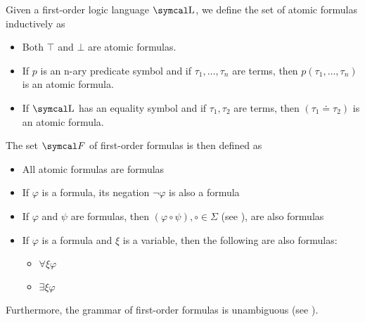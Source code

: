\begin{definition}\label{def:first_order_formula}\cite[189]{OpenLogic20201202}
  Given a first-order logic language \( \CL \), we define the set of atomic formulas inductively as
  \begin{itemize}
    \item Both \( \top \) and \( \bot \) are atomic formulas.
    \item If \( p \) is an n-ary predicate symbol and if \( \tau_1, \ldots, \tau_n \) are terms, then \( p(\tau_1, \ldots, \tau_n) \) is an atomic formula.
    \item If \( \CL \) has an equality symbol and if \( \tau_1, \tau_2 \) are terms, then \( (\tau_1 \doteq \tau_2) \) is an atomic formula.
  \end{itemize}

  The set \( \Cal{F} \) of first-order formulas is then defined as
  \begin{itemize}
    \item All atomic formulas are formulas
    \item If \( \varphi \) is a formula, its negation \( \neg \varphi \) is also a formula
    \item If \( \varphi \) and \( \psi \) are formulas, then \( (\varphi \circ \psi), \circ \in \Sigma \) (see ), are also formulas
    \item If \( \varphi \) is a formula and \( \xi \) is a variable, then the following are also formulas:
    \begin{itemize}
      \item \( \forall \xi \varphi \)
      \item \( \exists \xi \varphi \)
    \end{itemize}
  \end{itemize}

  Furthermore, the grammar of first-order formulas is unambiguous (see ).


\end{definition}
